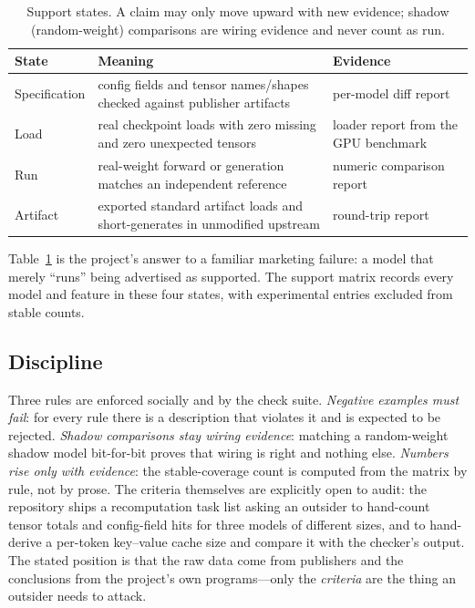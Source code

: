 \documentclass[11pt,a4paper]{article}
\newcommand{\q}[1]{\textquotedblleft #1\textquotedblright}
\begin{document}
\begin{table}[t]
\centering
\caption{Support states. A claim may only move upward with new evidence;
shadow (random-weight) comparisons are wiring evidence and never count as
run.}
\label{tab:states}
\begin{tabular}{@{}p{2.6cm}p{5.2cm}p{5.2cm}@{}}
\toprule
State & Meaning & Evidence \\
\midrule
Specification & config fields and tensor names/shapes checked against
publisher artifacts & per-model diff report \\
Load & real checkpoint loads with zero missing and zero unexpected tensors &
loader report from the GPU benchmark \\
Run & real-weight forward or generation matches an independent reference &
numeric comparison report \\
Artifact & exported standard artifact loads and short-generates in unmodified
upstream & round-trip report \\
\bottomrule
\end{tabular}
\end{table}

Table~\ref{tab:states} is the project's answer to a familiar marketing
failure: a model that merely \q{runs} being advertised as supported. The
support matrix records every model and feature in these four states, with
experimental entries excluded from stable counts.

\subsection{Discipline}

Three rules are enforced socially and by the check suite. \emph{Negative
examples must fail}: for every rule there is a description that violates it
and is expected to be rejected. \emph{Shadow comparisons stay wiring
evidence}: matching a random-weight shadow model bit-for-bit proves that
wiring is right and nothing else. \emph{Numbers rise only with evidence}:
the stable-coverage count is computed from the matrix by rule, not by prose.
The criteria themselves are explicitly open to audit: the repository ships a
recomputation task list asking an outsider to hand-count tensor totals and
config-field hits for three models of different sizes, and to hand-derive a
per-token key--value cache size and compare it with the checker's output. The
stated position is that the raw data come from publishers and the conclusions
from the project's own programs---only the \emph{criteria} are the thing an
outsider needs to attack.
\end{document}
